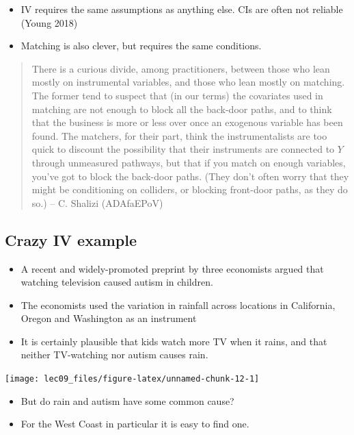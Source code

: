 \documentclass[]{article}
\begin{document}
\begin{itemize}
\item
  IV requires the same assumptions as anything else. CIs are often not
  reliable (Young 2018)
\item
  Matching is also clever, but requires the same conditions.
\end{itemize}

\begin{quote}
There is a curious divide, among practitioners, between those who lean
mostly on instrumental variables, and those who lean mostly on matching.
The former tend to suspect that (in our terms) the covariates used in
matching are not enough to block all the back-door paths, and to think
that the business is more or less over once an exogenous variable has
been found. The matchers, for their part, think the instrumentalists are
too quick to discount the possibility that their instruments are
connected to \(Y\) through unmeasured pathways, but that if you match on
enough variables, you've got to block the back-door paths. (They don't
often worry that they might be conditioning on colliders, or blocking
front-door paths, as they do so.) -- C. Shalizi (ADAfaEPoV)
\end{quote}

\hypertarget{crazy-iv-example}{%
\subsection{Crazy IV example}\label{crazy-iv-example}}

\begin{itemize}
\item
  A recent and widely-promoted preprint by three economists argued that
  watching television caused autism in children.
\item
  The economists used the variation in rainfall across locations in
  California, Oregon and Washington as an instrument
\item
  It is certainly plausible that kids watch more TV when it rains, and
  that neither TV-watching nor autism causes rain.
\end{itemize}

\begin{center}\texttt{[image: lec09\_files/figure-latex/unnamed-chunk-12-1]} \end{center}

\begin{itemize}
\item
  But do rain and autism have some common cause?
\item
  For the West Coast in particular it is easy to find one.
\end{itemize}
\end{document}
